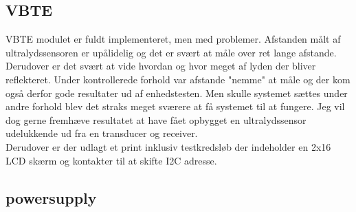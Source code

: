 \subsection{VBTE}
VBTE modulet er fuldt implementeret, men med problemer. Afstanden målt af ultralydssensoren er upålidelig og det er svært at måle over ret lange afstande. Derudover er det svært at vide hvordan og hvor meget af lyden der bliver reflekteret. Under kontrollerede forhold var afstande "nemme" at måle og der kom også derfor gode resultater ud af enhedstesten. Men skulle systemet sættes under andre forhold blev det straks meget sværere at få systemet til at fungere. Jeg vil dog gerne fremhæve resultatet at have fået opbygget en ultralydssensor udelukkende ud fra en transducer og receiver.\\ Derudover er der udlagt et print inklusiv testkredsløb der indeholder en 2x16 LCD skærm og kontakter til at skifte I2C adresse.

\subsection{powersupply}

